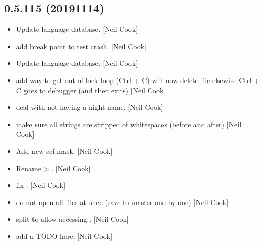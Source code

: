 \documentclass[a4paper,10pt,english]{report}
\begin{document}
\subsection{0.5.115 (2019\sphinxhyphen{}11\sphinxhyphen{}14)}
\label{\detokenize{misc/changelog:id47}}\begin{itemize}
\item {} 
Update language database. {[}Neil Cook{]}

\item {} 
 \sphinxhyphen{} add break point to test crash. {[}Neil
Cook{]}

\item {} 
Update language database. {[}Neil Cook{]}

\item {} 
 \sphinxhyphen{} add way to get out of lock loop (Ctrl + C) will now
delete file \sphinxhyphen{} elsewise Ctrl + C goes to debugger (and then exits)
{[}Neil Cook{]}

\item {} 
 \sphinxhyphen{} deal with not having a night name. {[}Neil
Cook{]}

\item {} 
 \sphinxhyphen{} make sure all strings are stripped of
whitespaces (before and after) {[}Neil Cook{]}

\item {} 
Add new ccf mask. {[}Neil Cook{]}

\item {} 
Rename  \textendash{}\textgreater{} . {[}Neil Cook{]}

\item {} 
 \sphinxhyphen{}fix . {[}Neil Cook{]}

\item {} 
 \sphinxhyphen{} do not open all files at once (save to master
one by one) {[}Neil Cook{]}

\item {} 
 \sphinxhyphen{} split  to allow accessing
. {[}Neil Cook{]}

\item {} 
 \sphinxhyphen{} add a TODO here. {[}Neil Cook{]}


\end{itemize}
\end{document}
